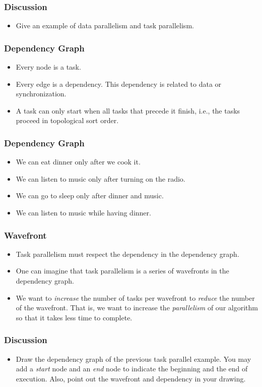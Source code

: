 \documentclass{beamer}
\begin{document}
\begin{CJK}{UTF8}{bsmi}
  \begin{frame}
    \frametitle{Discussion} 
    \begin{itemize}
    \item Give an example of data parallelism and task parallelism.
    \end{itemize}
  \end{frame}


  \begin{frame}
    \frametitle{Dependency Graph}
    \begin{itemize}
    \item Every node is a task.
    \item Every edge is a dependency. This dependency is related to data or synchronization.
    \item A task can only start when all tasks that precede it finish, i.e., the tasks proceed in topological sort order.
    \end{itemize}
  \end{frame}

  \begin{frame}
    \frametitle{Dependency Graph}
    \begin{itemize}
    \item We can eat dinner only after we cook it. 
    \item We can listen to music only after turning on the radio.
    \item We can go to sleep only after dinner and music.
    \item We can listen to music while having dinner.
    \end{itemize}
  \end{frame}

  \begin{frame}
    \frametitle{Wavefront}
    \begin{itemize}
    \item Task parallelism must respect the dependency in the dependency graph.
    \item One can imagine that task parallelism is a series of wavefronts in the dependency graph.  
    \item We want to {\em increase} the number of tasks per wavefront to {\em reduce} the number of the wavefront. That is, we want to increase the {\em parallelism} of our algorithm so that it takes less time to complete.
    \end{itemize}
  \end{frame}

  \begin{frame}
    \frametitle{Discussion} 
    \begin{itemize}
    \item Draw the dependency graph of the previous task parallel example. You may add a {\em start} node and an {\em end} node to indicate the beginning and the end of execution. 
      Also, point out the wavefront and dependency in your drawing.
    \end{itemize}
  \end{frame}



\end{CJK}
\end{document}
